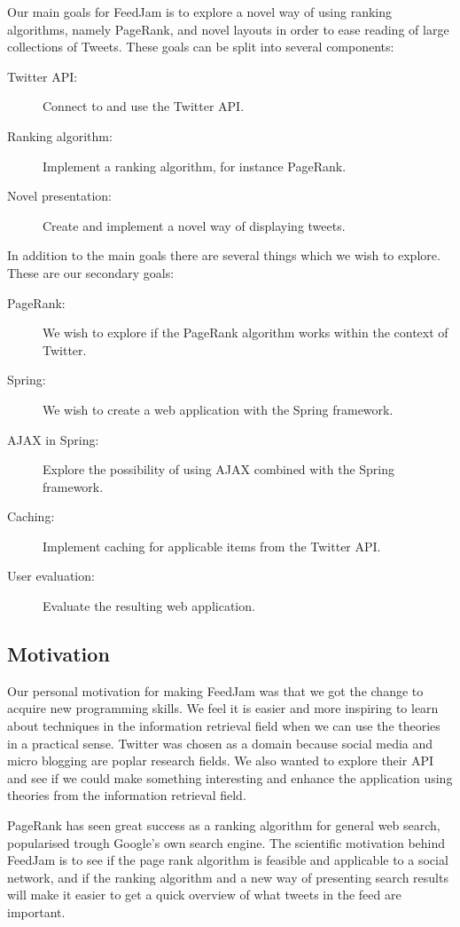 Our main goals for FeedJam is to explore a novel way of using ranking algorithms, namely PageRank, and novel layouts in order to ease reading of large collections of Tweets. These goals can be split into several components:

\begin{description}
  \item[Twitter API:] Connect to and use the Twitter API.
  \item[Ranking algorithm:] Implement a ranking algorithm, for instance PageRank.
  \item[Novel presentation:] Create and implement a novel way of displaying tweets.
\end{description}

In addition to the main goals there are several things which we wish to explore. These are our secondary goals:

\begin{description}
  \item[PageRank:] We wish to explore if the PageRank algorithm works within the context of Twitter.
  \item[Spring:] We wish to create a web application with the Spring framework.
  \item[AJAX in Spring:] Explore the possibility of using AJAX combined with the Spring framework.
  \item[Caching:] Implement caching for applicable items from the Twitter API.
  \item[User evaluation:] Evaluate the resulting web application.
\end{description}

\subsection{Motivation} %
Our personal motivation for making FeedJam was that we got the change to acquire new programming skills. We feel it is easier and more inspiring to learn about techniques in the information retrieval field when we can use the theories in a practical sense. Twitter was chosen as a domain because social media and micro blogging are poplar research fields. We also wanted to explore their API and see if we could make something interesting and enhance the application using theories from the information retrieval field.

PageRank has seen great success as a ranking algorithm for general web search, popularised trough Google's own search engine. The scientific motivation behind FeedJam is to see if the page rank algorithm is feasible and applicable to a social network, and if the ranking algorithm and a new way of presenting search results will make it easier to get a quick overview of what tweets in the feed are important.